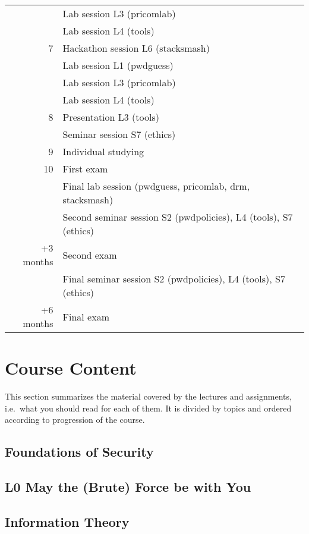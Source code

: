 \begin{table}
\begin{tabular}{rp{9cm}}
      & Lab session L3 (pricomlab)\\
      & Lab session L4 (tools)\\
    \midrule
    7
      & Hackathon session L6 (stacksmash)\\
      & Lab session L1 (pwdguess)\\
      & Lab session L3 (pricomlab)\\
      & Lab session L4 (tools)\\
    \midrule
    8
      & Presentation L3 (tools)\\
      & Seminar session S7 (ethics)\\
    \midrule
    9
      & Individual studying\\
    \midrule
    10
      & First exam \\
      & Final lab session (pwdguess, pricomlab, drm, stacksmash)\\
      & Second seminar session S2 (pwdpolicies), L4 (tools), S7 (ethics)\\
    \midrule
    +3 months
      & Second exam \\
      & Final seminar session S2 (pwdpolicies), L4 (tools), S7 (ethics)\\
    \midrule
    +6 months
      & Final exam\\
    \bottomrule
  \end{tabular}
\end{table}


\section{Course Content}

This section summarizes the material covered by the lectures and assignments, 
i.e.\ what you should read for each of them.
It is divided by topics and ordered according to progression of the course.

\subsection{Foundations of Security}


\subsection{L0 May the (Brute) Force be with You}


\subsection{Information Theory}


